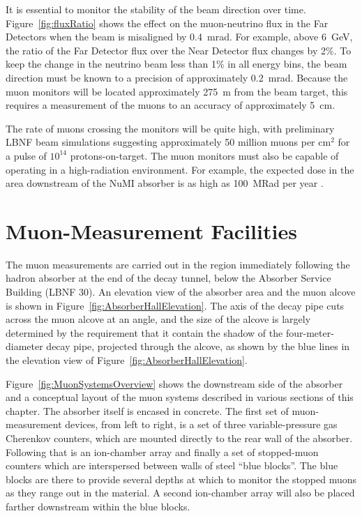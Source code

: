 It is essential to monitor the stability of the beam direction over
time. Figure~\ref{fig:fluxRatio} shows the effect on the muon-neutrino
flux in the Far Detectors when the beam is misaligned by 0.4~mrad.  
For example, above 6~GeV, the ratio of the Far Detector flux over 
the Near Detector flux changes by 2\%.  
To keep the change in the neutrino beam less than 1\% in all energy bins,
the beam direction must be known to a precision of approximately 0.2~mrad. 
Because the muon monitors will be located approximately 275~m
from the beam target, this requires a measurement of the muons to an
accuracy of approximately 5~cm.


The rate of muons crossing the monitors will be quite high, with
preliminary LBNF beam simulations suggesting approximately 50 million
muons per cm$^{2}$ for a pulse of $10^{14}$ protons-on-target. The
muon monitors must also be capable of operating in a high-radiation
environment.  For example, the expected dose in the area downstream of
the NuMI absorber is as high as 100~MRad per year \cite{ref:NuMIBeamMonitors}.

%
%
\section{Muon-Measurement Facilities}
\label{sec:nd-blm-muon-measurement-facilities}

The muon measurements are carried out in the region immediately
following the hadron absorber at the end of the decay tunnel, below
the Absorber Service Building (LBNF 30).  An elevation view
of the absorber area and the muon alcove is shown in Figure~\ref{fig:AbsorberHallElevation}. 
The axis of the decay pipe cuts across the muon alcove at an angle, and the size of the alcove
is largely determined by the requirement that it contain the
shadow of the four-meter-diameter decay pipe, projected through the
alcove, as shown by the blue lines in the elevation view of Figure~\ref{fig:AbsorberHallElevation}. 

Figure~\ref{fig:MuonSystemsOverview} shows the downstream side of the
absorber and a conceptual layout of the muon systems described in various sections of this
chapter.  
The absorber itself is encased in concrete. The first set of
muon-measurement devices, from left to right, is a
set of three variable-pressure gas Cherenkov counters, which are
mounted directly to the rear wall of the absorber. Following that is an ion-chamber array and finally a set of stopped-muon counters which are interspersed between walls of
steel ``blue blocks''.   The blue blocks are there to provide several
depths at which to monitor the stopped muons as they range out in the
material. A second ion-chamber array will also be placed farther downstream within the blue blocks.


